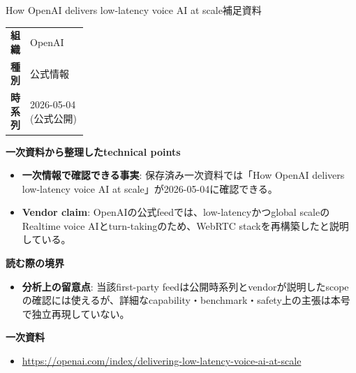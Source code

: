 \begin{technicalnote}{How OpenAI delivers low-latency voice AI at scale}{補足資料}
\begingroup
\begin{tabularx}{\linewidth}{@{}>{\bfseries}p{0.22\linewidth}X@{}}
組織 & OpenAI \\
種別 & 公式情報 \\
時系列 & 2026-05-04 (公式公開) \\
\end{tabularx}
\smallskip
{\bfseries 一次資料から整理したtechnical points}
\begin{itemize}[leftmargin=1.5em,itemsep=0.35em]
\item \textbf{一次情報で確認できる事実}: 保存済み一次資料では「How OpenAI delivers low-latency voice AI at scale」が2026-05-04に確認できる。
\item \textbf{Vendor claim}: OpenAIの公式feedでは、low-latencyかつglobal scaleのRealtime voice AIとturn-takingのため、WebRTC stackを再構築したと説明している。
\end{itemize}
{\bfseries 読む際の境界}
\begin{itemize}[leftmargin=1.5em,itemsep=0.35em]
\item \textbf{分析上の留意点}: 当該first-party feedは公開時系列とvendorが説明したscopeの確認には使えるが、詳細なcapability・benchmark・safety上の主張は本号で独立再現していない。
\end{itemize}
\begin{samepage}
{\bfseries 一次資料}
\begingroup\sloppy
\begin{itemize}[leftmargin=1.5em,itemsep=0.25em]
\item {\scriptsize\url{https://openai.com/index/delivering-low-latency-voice-ai-at-scale}}
\end{itemize}
\endgroup
\end{samepage}
\endgroup
\end{technicalnote}
\medskip
